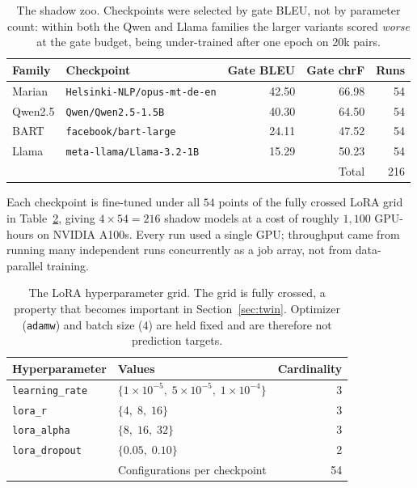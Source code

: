 \documentclass[11pt]{article}
\newcommand{\hd}[1]{\texttt{#1}}
\begin{document}
\begin{table}[t]
\centering
\caption{The shadow zoo. Checkpoints were selected by gate BLEU, not by parameter count:
within both the Qwen and Llama families the larger variants scored \emph{worse} at the
gate budget, being under-trained after one epoch on 20k pairs.}
\label{tab:zoo}
\begin{tabular}{llrrr}
\toprule
Family & Checkpoint & Gate BLEU & Gate chrF & Runs \\
\midrule
Marian  & \texttt{Helsinki-NLP/opus-mt-de-en} & 42.50 & 66.98 & 54 \\
Qwen2.5 & \texttt{Qwen/Qwen2.5-1.5B}          & 40.30 & 64.50 & 54 \\
BART    & \texttt{facebook/bart-large}        & 24.11 & 47.52 & 54 \\
Llama   & \texttt{meta-llama/Llama-3.2-1B}    & 15.29 & 50.23 & 54 \\
\midrule
\multicolumn{4}{r}{Total} & 216 \\
\bottomrule
\end{tabular}
\end{table}

Each checkpoint is fine-tuned under all $54$ points of the fully crossed LoRA grid in
Table~\ref{tab:grid}, giving $4 \times 54 = 216$ shadow models at a cost of roughly
$1{,}100$ GPU-hours on NVIDIA A100s. Every run used a single GPU; throughput came from
running many independent runs concurrently as a job array, not from data-parallel
training.

\begin{table}[t]
\centering
\caption{The LoRA hyperparameter grid. The grid is fully crossed, a property that becomes
important in Section~\ref{sec:twin}. Optimizer (\texttt{adamw}) and batch size ($4$) are
held fixed and are therefore not prediction targets.}
\label{tab:grid}
\begin{tabular}{llr}
\toprule
Hyperparameter & Values & Cardinality \\
\midrule
\hd{learning\_rate} & $\{1\!\times\!10^{-5},\; 5\!\times\!10^{-5},\; 1\!\times\!10^{-4}\}$ & 3 \\
\hd{lora\_r}        & $\{4,\; 8,\; 16\}$        & 3 \\
\hd{lora\_alpha}    & $\{8,\; 16,\; 32\}$       & 3 \\
\hd{lora\_dropout}  & $\{0.05,\; 0.10\}$        & 2 \\
\midrule
\multicolumn{2}{r}{Configurations per checkpoint} & 54 \\
\bottomrule
\end{tabular}
\end{table}
\end{document}
